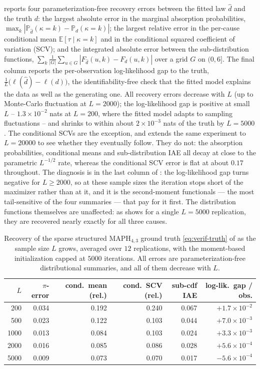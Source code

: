 \documentclass{article}
\newcommand{\Prob}{\mathbb{P}}
\newcommand{\ex}[1]{\mathbb{E}\left[#1\right]}
\newcommand{\aachg}[1]{#1}
\newcommand{\subchg}[1]{#1}
\begin{document}
 reports four parameterization-free recovery errors between the fitted law $\hat d$ and the truth $d$: the largest absolute error in the marginal absorption probabilities, $\max_k|\Prob_{\hat d}(\kappa=k)-\Prob_{d}(\kappa=k)|$; the largest relative error in the per-cause conditional mean $\ex{\tau\mid\kappa=k}$ and in the conditional squared coefficient of variation (SCV); and the integrated absolute error between the sub-distribution functions, $\sum_{k}\frac1{|G|}\sum_{u\in G}|F_{\hat d}(u,k)-F_{d}(u,k)|$ over a grid $G$ on $(0,6]$. The final column reports the per-observation log-likelihood gap to the truth, $\frac1L\big(\ell(\hat d)-\ell(d)\big)$, the identifiability-free check that the fitted model explains the data as well as the generating one. All recovery errors decrease with $L$ (up to Monte-Carlo fluctuation at $L=2000$); the log-likelihood gap is positive at small $L$ -- $1.3\times10^{-2}$ nats at $L=200$, where the fitted model adapts to sampling fluctuations -- and shrinks to within about $2\times10^{-3}$ nats of the truth by $L=5000$. \aachg{The conditional SCVs are the exception, and \Cref{fig:verif-scaling} extends the same experiment to $L=20000$ to see whether they eventually follow. They do not: the absorption probabilities, conditional means and sub-distribution IAE all decay at close to the parametric $L^{-1/2}$ rate, whereas the conditional SCV error is flat at about $0.17$ throughout. The diagnosis is in the last column of \Cref{tab:verif}: the log-likelihood gap turns negative for $L\ge2000$, so at these sample sizes the iteration stops short of the maximizer rather than at it, and it is the second-moment functionals --- the most tail-sensitive of the four summaries --- that pay for it first. The distribution functions themselves are unaffected: as \Cref{fig:verif-cdf} shows for a single $L=5000$ replication, they are recovered nearly exactly for all three causes.}

\begin{table}[ht]
\centering
\begin{tabular}{r r r r r r}
\toprule
$L$ & $\pi$-error & cond.\ mean (rel.) & cond.\ SCV (rel.) & sub-cdf IAE & log-lik.\ gap / obs. \\
\midrule
 200 & 0.034 & 0.192 & 0.240 & 0.067 & $+1.7\times10^{-2}$ \\
 500 & 0.023 & 0.122 & 0.103 & 0.044 & $+7.0\times10^{-3}$ \\
1000 & 0.013 & 0.084 & 0.103 & 0.024 & $+3.3\times10^{-3}$ \\
2000 & 0.016 & 0.085 & 0.086 & 0.028 & $+5.6\times10^{-4}$ \\
5000 & 0.009 & 0.073 & 0.070 & 0.017 & $-5.6\times10^{-4}$ \\
\bottomrule
\end{tabular}
\caption{Recovery of the sparse structured $\text{MAPH}_{4,3}$ ground truth \eqref{eq:verif-truth} of  as the sample size $L$ grows, averaged over $12$ replications, \subchg{with the moment-based initialization capped at $5000$ iterations. All errors are parameterization-free distributional summaries, and all of them decrease with $L$.}}
\label{tab:verif}
\end{table}
\end{document}
